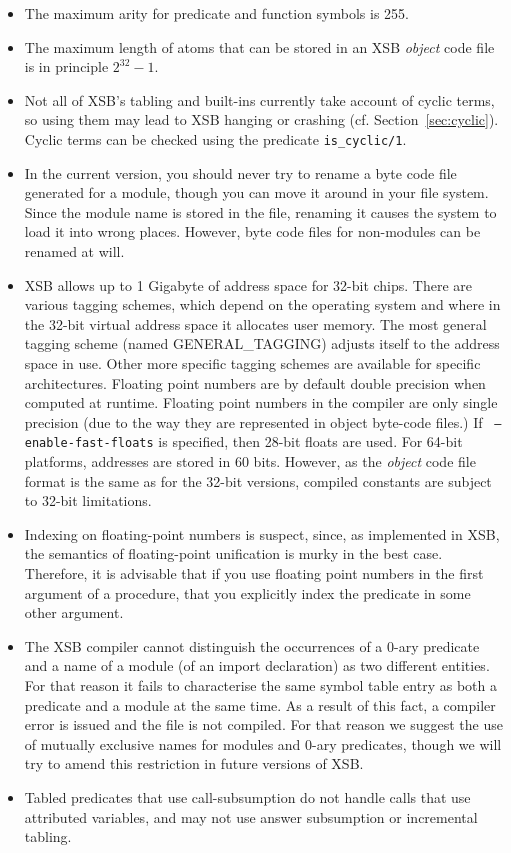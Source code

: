 \begin{itemize}
\item The maximum arity for predicate and function symbols is 255.
%
\item The maximum length of atoms that can be stored in an XSB
      \emph{object} code file is in principle $2^{32}-1$.
%
\item Not all of XSB's tabling and built-ins currently take account of
  cyclic terms, so using them may lead to XSB hanging or crashing
  (cf. Section~\ref{sec:cyclic}).  Cyclic terms can be checked using
  the predicate {\tt is\_cyclic/1}.
%
\item In the current version, you should never try to rename a byte code 
      file generated for a module, though you can move it around in your 
      file system.  Since the module name is stored in the file, renaming it
      causes the system to load it into wrong places.  However, byte code 
      files for non-modules can be renamed at will.
%
\item XSB allows up to 1 Gigabyte of address space for 32-bit chips.
  There are various tagging schemes, which depend on the operating
  system and where in the 32-bit virtual address space it allocates
  user memory.  The most general tagging scheme (named
  GENERAL\_TAGGING) adjusts itself to the address space in use.  Other
  more specific tagging schemes are available for specific
  architectures.  Floating point numbers are by default double
  precision when computed at runtime.  Floating point numbers in the
  compiler are only single precision (due to the way they are
  represented in object byte-code files.)  If {\tt
    --enable-fast-floats} is specified, then 28-bit floats are used.
  For 64-bit platforms, addresses are stored in 60 bits.  However, as
  the \emph{object} code file format is the same as for the 32-bit
  versions, compiled constants are subject to 32-bit limitations.
%
\item Indexing on floating-point numbers is suspect, since, as
      implemented in XSB, the semantics of floating-point unification
      is murky in the best case. Therefore, it is advisable that if
      you use floating point numbers in the first argument of a
      procedure, that you explicitly index the predicate in some other
      argument.
%
\item	The XSB compiler cannot distinguish the occurrences of a
      0-ary predicate and a name of a module (of an import declaration) as
      two different entities.  For that reason it fails to characterise the
      same symbol table entry as both a predicate and a module at the
      same time.  As a result of this fact, a compiler error is issued
      and the file is not compiled.  For that reason we suggest the
      use of mutually exclusive names for modules and 0-ary predicates,
      though we will try to amend this restriction in future versions of
      XSB.
%
\item Tabled predicates that use call-subsumption do not handle calls
  that use attributed variables, and may not use answer subsumption or
  incremental tabling.


\end{itemize}
